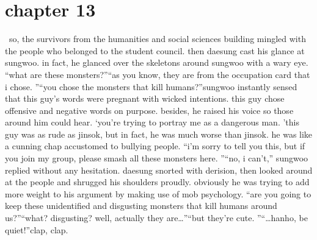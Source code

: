 \section{chapter 13}






 so, the survivors from the humanities and social sciences building mingled with the people who belonged to the student council.
 then daesung cast his glance at sungwoo.
 in fact, he glanced over the skeletons around sungwoo with a wary eye.
“what are these monsters?”“as you know, they are from the occupation card that i chose.
”“you chose the monsters that kill humans?”sungwoo instantly sensed that this guy’s words were pregnant with wicked intentions.
 this guy chose offensive and negative words on purpose.
 besides, he raised his voice so those around him could hear.
‘you’re trying to portray me as a dangerous man.
’this guy was as rude as jinsok, but in fact, he was much worse than jinsok.
 he was like a cunning chap accustomed to bullying people.
“i’m sorry to tell you this, but if you join my group, please smash all these monsters here.
”“no, i can’t,” sungwoo replied without any hesitation.
 daesung snorted with derision, then looked around at the people and shrugged his shoulders proudly.
obviously he was trying to add more weight to his argument by making use of mob psychology.
“are you going to keep these unidentified and disgusting monsters that kill humans around us?”“what? disgusting? well, actually they are…”“but they’re cute.
”“…hanho, be quiet!”clap, clap.

